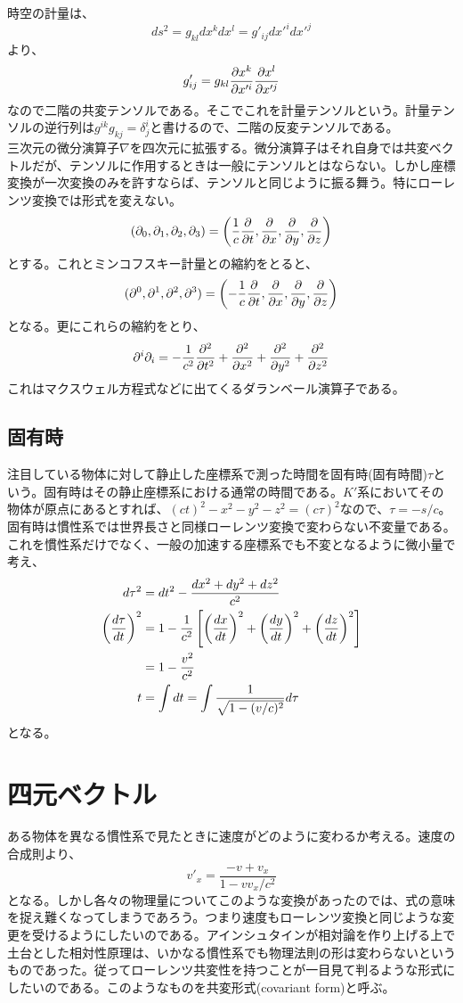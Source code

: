     時空の計量は、
        \[ds^2 = g_{kl}dx^kdx^l = g'_{ij}dx'^idx'^j\]
    より、
        \[g'_{ij} = g_{kl}\pd[x^k]{x'^i}\pd[x^l]{x'^j}\]
    なので二階の共変テンソルである。そこでこれを計量テンソルという。計量テンソルの逆行列は$g^{ik}g_{kj}=\delta^i_j$と書けるので、二階の反変テンソルである。\\
    三次元の微分演算子$\nabla$を四次元に拡張する。微分演算子はそれ自身では共変ベクトルだが、テンソルに作用するときは一般にテンソルとはならない。しかし座標変換が一次変換のみを許すならば、テンソルと同じように振る舞う。特にローレンツ変換では形式を変えない。
        \[(\pa_0,\pa_1,\pa_2,\pa_3) = \lr{\rec{c}\pd{t},\pd{x},\pd{y},\pd{z}}\]
    とする。これとミンコフスキー計量との縮約をとると、
        \[(\pa^0,\pa^1,\pa^2,\pa^3) = \lr{-\rec{c}\pd{t},\pd{x},\pd{y},\pd{z}}\]
    となる。更にこれらの縮約をとり、
        \[\pa^i\pa_i = -\rec{c^2}\pd[^2]{t^2} + \pd[^2]{x^2}+\pd[^2]{y^2}+\pd[^2]{z^2}\]
    これはマクスウェル方程式などに出てくるダランベール演算子である。

\subsection{固有時}
    注目している物体に対して静止した座標系で測った時間を固有時(固有時間)$\tau$という。固有時はその静止座標系における通常の時間である。$K'$系においてその物体が原点にあるとすれば、$(ct)^2-x^2-y^2-z^2=(c\tau)^2$なので、$\tau = -s/c$。固有時は慣性系では世界長さと同様ローレンツ変換で変わらない不変量である。これを慣性系だけでなく、一般の加速する座標系でも不変となるように微小量で考え、
    \begin{align*}
        d\tau^2 &= dt^2-\frac{dx^2+dy^2+dz^2}{c^2}\\
        \lr{\di[\tau]{t}}^2 &= 1-\rec{c^2}\llr{\lr{\di[x]{t}}^2+\lr{\di[y]{t}}^2+\lr{\di[z]{t}}^2}\\
        &= 1-\frac{v^2}{c^2}\\
        t &= \int dt = \int \rec{\sqrt{1-(v/c)^2}}d\tau
    \end{align*}
    となる。

\section{四元ベクトル}
    ある物体を異なる慣性系で見たときに速度がどのように変わるか考える。速度の合成則より、
        \[v'_x = \frac{-v + v_x}{1 - vv_x/c^2}\]
    となる。しかし各々の物理量についてこのような変換があったのでは、式の意味を捉え難くなってしまうであろう。つまり速度もローレンツ変換と同じような変更を受けるようにしたいのである。アインシュタインが相対論を作り上げる上で土台とした相対性原理は、いかなる慣性系でも物理法則の形は変わらないというものであった。従ってローレンツ共変性を持つことが一目見て判るような形式にしたいのである。このようなものを共変形式(covariant form)と呼ぶ。


